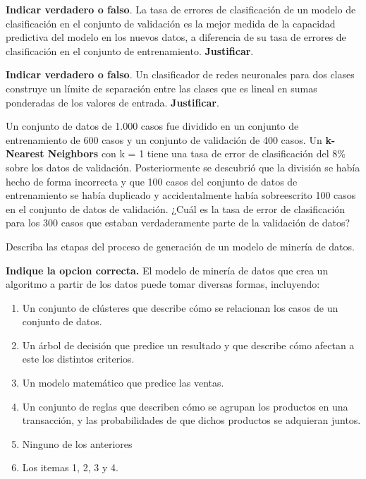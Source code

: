 \documentclass[11pt]{exam}
\begin{document}
\begin{questions}
\addpoints
\question[1] \textbf{Indicar verdadero o falso}. La tasa de errores de clasificación de un modelo de clasificación en el conjunto de validación es la mejor medida de la capacidad predictiva del modelo en los nuevos datos, a diferencia de su tasa de errores de clasificación en el conjunto de entrenamiento. \textbf{Justificar}.
\vspace{1in}

\addpoints
\question[1] \textbf{Indicar verdadero o falso}. Un clasificador de redes neuronales para dos clases construye un límite de separación entre las clases que es lineal en sumas ponderadas de los valores de entrada. \textbf{Justificar}.

\newpage
\addpoints
\question[1] Un conjunto de datos de 1.000 casos fue dividido en un conjunto de entrenamiento de 600 casos y un conjunto de validación de 400 casos. Un \textbf{k-Nearest Neighbors} con k = 1 tiene una tasa de error de clasificación del 8\% sobre los datos de validación. Posteriormente se descubrió que la división se había hecho de forma incorrecta y que 100 casos del conjunto de datos de entrenamiento se había duplicado y accidentalmente había sobreescrito 100 casos en el conjunto de datos de validación. ¿Cuál es la tasa de error de clasificación para los 300 casos que estaban verdaderamente parte de la validación de datos?
\vspace{2in}

\addpoints
\question[2] Describa las etapas del proceso de generación de un modelo de minería de datos.
\vspace{2in}


\addpoints
\question[1] \textbf{Indique la opcion correcta.} El modelo de minería de datos que crea un algoritmo a partir de los datos puede tomar diversas formas, incluyendo:

\begin{enumerate}
\item Un conjunto de clústeres que describe cómo se relacionan los casos de un conjunto de datos.
\item Un árbol de decisión que predice un resultado y que describe cómo afectan a este los distintos criterios.
\item Un modelo matemático que predice las ventas.
\item Un conjunto de reglas que describen cómo se agrupan los productos en una transacción, y las probabilidades de que dichos productos se adquieran juntos.
\item Ninguno de los anteriores
\item Los itemas 1, 2, 3 y 4.
\end{enumerate}



\end{questions}
\end{document}
